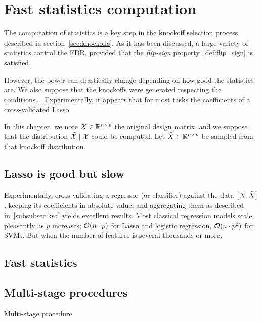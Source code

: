 \chapter{Fast statistics computation}\label{ch:fsc}

The computation of statistics is a key step in the knockoff selection process described in section~\ref{sec:knockoffs}.
As it has been discussed, a large variety of statistics control the FDR,
provided that the \textit{flip-sign} property~\ref{def:flip_sign} is satisfied.

However, the power can drastically change depending on how good the statistics are.
We also suppose that the knockoffs were generated respecting the conditions\dots.
Experimentally, it appears that for most tasks the coefficients of a cross-validated Lasso

In this chapter, we note $X \in \mathbb{R}^{n \times p}$ the original design matrix,
and we suppose that the distribution $\tilde{\mathcal{X}} \mid \mathcal{X}$ could be computed.
Let $\tilde{X} \in \mathbb{R}^{n \times p}$ be sampled from that knockoff distribution.

\section{Lasso is good but slow}\label{sec:}

Experimentally, cross-validating a regressor (or classifier) against the data $\big[ X, \tilde{X} \big]$,
keeping its coefficients in absolute value,
and aggregating them as described in~\ref{subsubsec:ksa} yields excellent results.
Most classical regression models scale pleasantly as $p$ increases;
$\mathcal{O}(n \cdot p)$ for Lasso and logistic regression,
$\mathcal{O}(n \cdot p^2)$ for SVMs.
But when the number of features is several thousands or more,


\section{Fast statistics}\label{sec:a}

\section{Multi-stage procedures}\label{sec:multi_stage}

Multi-stage procedure~\cite{multi_stage_fdr}
